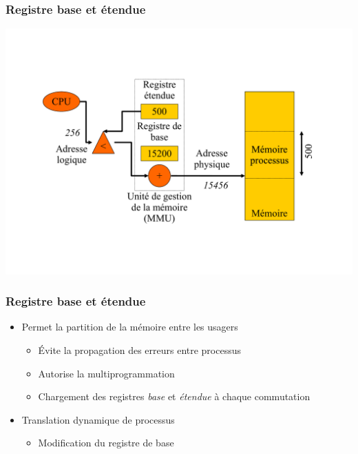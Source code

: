 \begin{frame}
\frametitle{Registre base et étendue}
\includegraphics[width=\textwidth]{../illustration/memoire_principale_base_etendue.pdf}
\end{frame}


\begin{frame}
\frametitle{Registre base et étendue}
\begin{itemize}
\item Permet la partition de la mémoire entre les usagers
\begin{itemize}
\item Évite la propagation des erreurs entre processus
\item Autorise la multiprogrammation
\item Chargement des registres \textit{base} et \textit{étendue} à chaque commutation
\end{itemize}
\item Translation dynamique de processus
\begin{itemize}
\item Modification du registre de base
\end{itemize}
\end{itemize}
\end{frame}



